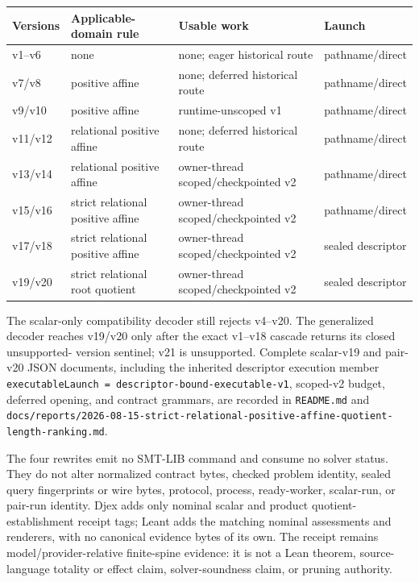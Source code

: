 \documentclass[11pt,oneside]{article}
\newcommand{\code}[1]{\texttt{#1}}
\newcommand{\filepath}[1]{\nolinkurl{#1}}
\begin{document}
\begin{small}
\begin{longtable}{@{}L{0.12\textwidth}L{0.32\textwidth}L{0.27\textwidth}L{0.20\textwidth}@{}}
\toprule
\textbf{Versions} & \textbf{Applicable-domain rule} & \textbf{Usable work} &
\textbf{Launch} \\
\midrule
\endhead
v1--v6 & none & none; eager historical route & pathname/direct \\
v7/v8 & positive affine & none; deferred historical route & pathname/direct \\
v9/v10 & positive affine & runtime-unscoped v1 & pathname/direct \\
v11/v12 & relational positive affine & none; deferred historical route & pathname/direct \\
v13/v14 & relational positive affine & owner-thread scoped/checkpointed v2 & pathname/direct \\
v15/v16 & strict relational positive affine & owner-thread scoped/checkpointed v2 & pathname/direct \\
v17/v18 & strict relational positive affine & owner-thread scoped/checkpointed v2 & sealed descriptor \\
v19/v20 & strict relational root quotient & owner-thread scoped/checkpointed v2 & sealed descriptor \\
\bottomrule
\end{longtable}
\end{small}

The scalar-only compatibility decoder still rejects v4--v20.  The generalized decoder
reaches v19/v20 only after the exact v1--v18 cascade returns its closed unsupported-
version sentinel; v21 is unsupported.  Complete scalar-v19 and pair-v20 JSON documents,
including the inherited descriptor execution member
\code{executableLaunch = descriptor-bound-executable-v1}, scoped-v2 budget, deferred
opening, and contract grammars, are recorded in
\filepath{README.md} and
\filepath{docs/reports/2026-08-15-strict-relational-positive-affine-quotient-length-ranking.md}.

\begin{soundbox}[title=Evidence and identity remain separate]
The four rewrites emit no SMT-LIB command and consume no solver status.  They do not
alter normalized contract bytes, checked problem identity, sealed query fingerprints or
wire bytes, protocol, process, ready-worker, scalar-run, or pair-run identity.  Djex
adds only nominal scalar and product quotient-establishment receipt tags; Leant adds
the matching nominal assessments and renderers, with no canonical evidence bytes of
its own.  The receipt remains model/provider-relative finite-spine evidence: it is not
a Lean theorem, source-language totality or effect claim, solver-soundness claim, or
pruning authority.
\end{soundbox}
\end{document}
